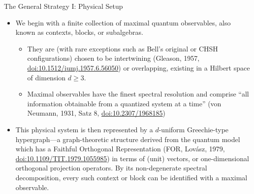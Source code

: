 \documentclass{beamer}
\begin{document}
\begin{frame}{The General Strategy I: Physical Setup}
\small
    \begin{itemize}[<+->] %
        \item We begin with a finite collection of \alert{maximal quantum observables}, also known as contexts, blocks, or subalgebras.
        \begin{itemize}[<+->] %
            \item They are (with rare exceptions such as Bell's original or CHSH configurations) chosen to be \alert{intertwining} (Gleason, 1957, \href{https://doi.org/10.1512/iumj.1957.6.56050}{doi:10.1512/iumj.1957.6.56050}) or overlapping, existing in a Hilbert space of dimension $d \ge 3$.
            \item Maximal observables have the finest spectral resolution and comprise ``all information obtainable from a quantized system at a time''
(von Neumann, 1931, Satz 8, \href{https://doi.org/10.2307/1968185}{doi:10.2307/1968185})
        \end{itemize}
        \item This physical system is then represented by a \alert{$d$-uniform Greechie-type hypergraph}---a
graph-theoretic structure derived from the quantum model which has a Faithful Orthogonal Representation
(FOR, Lov\'asz, 1979, \href{https://doi.org/10.1109/TIT.1979.1055985}{doi:10.1109/TIT.1979.1055985})
in terms of (unit) vectors, or one-dimensional orthogonal projection operators.
By its non-degenerate spectral decomposition, every such context or block can be identified with a maximal observable.
    \end{itemize}
\end{frame}
\end{document}
